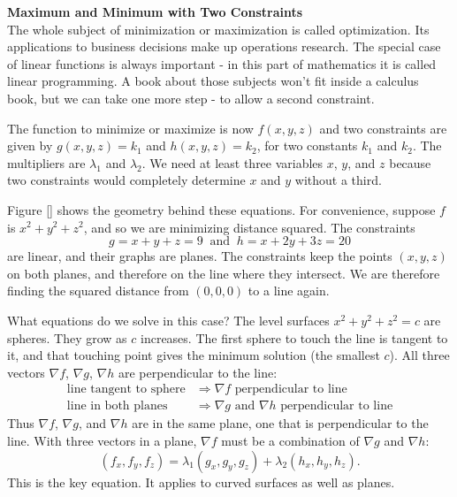 \noindent\textbf{\large Maximum and Minimum with Two Constraints}\\

The whole subject of minimization or maximization is called optimization. Its applications to business decisions make up operations research. The special case of linear functions is always important - in this part of mathematics it is called linear programming. A book about those subjects won't fit inside a calculus book, but we can take one more step - to allow a second constraint.

The function to minimize or maximize is now $f(x,y,z)$ and two constraints are given by $g(x,y,z) = k_1$ and $h(x,y,z) = k_2$, for two constants $k_1$ and $k_2$.  The multipliers are $\lambda_1$ and $\lambda_2$.  We need at least three variables $x$, $y$, and $z$ because two constraints would completely determine $x$ and $y$ without a third.

Figure \ref{} shows the geometry behind these equations.  For convenience, suppose $f$ is $x^2 + y^2 + z^2$, and so we are minimizing distance squared.  The constraints $$g = x + y + z = 9 \: \text{ and } \: h = x + 2y + 3z = 20$$ are linear, and their graphs are planes.  The constraints keep the points $(x,y,z)$ on both planes, and therefore on the line where they intersect.  We are therefore finding the squared distance from $(0,0,0)$ to a line again.  

What equations do we solve in this case?  The level surfaces $x^2 + y^2 + z^2 = c$ are spheres.  They grow as $c$ increases.  The first sphere to touch the line is tangent to it, and that touching point gives the minimum solution (the smallest $c$). All three vectors $\nabla f$, $\nabla g$, $\nabla h$ are perpendicular to the line:
\begin{align*}
\text{line tangent to sphere} & \Rightarrow \nabla f \text{ perpendicular to line} \\
\text{line in both planes} & \Rightarrow \nabla g \text{ and } \nabla h \text{ perpendicular to line}
\end{align*}
Thus $\nabla f$, $\nabla g$, and $\nabla h$ are in the same plane, one that is perpendicular to the line.  With three vectors in a plane, $\nabla f$ must be a combination of $\nabla g$ and $\nabla h$:
$$(f_x,f_y,f_z) = \lambda_1 (g_x,g_y,g_z) + \lambda_2 (h_x,h_y,h_z).$$
This is the key equation.  It applies to curved surfaces as well as planes.

